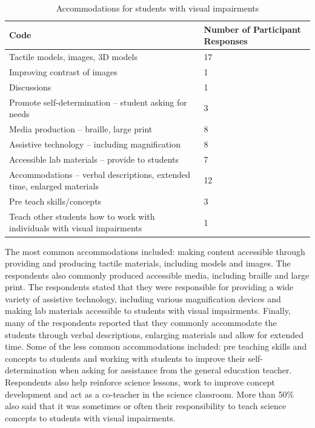 \documentclass[11.5pt]{sig-alternate} %
\begin{document}
\begin{large}
\begin{table}[h]
\caption{Accommodations for students with visual impairments}
\begin{tabular}{ll}
\hline
\textbf{Code} & \textbf{Number of Participant Responses} \\ \hline
Tactile models, images, 3D models & 17 \\
Improving contrast of images & 1 \\
Discussions	& 1 \\
Promote self-determination – student asking for needs & 3 \\
Media production – braille, large print	& 8 \\
Assistive technology – including magnification & 8 \\
Accessible lab materials – provide to students & 7 \\
Accommodations – verbal descriptions, extended time, enlarged materials & 12 \\
Pre teach skills/concepts & 3 \\
Teach other students how to work with individuals with visual impairments & 1 \\ \hline
\end{tabular}
\end{table}

The most common accommodations included: making content accessible through providing and producing tactile materials, including models and images.  The respondents also commonly produced accessible media, including braille and large print.  The respondents stated that they were responsible for providing a wide variety of assistive technology, including various magnification devices and making lab materials accessible to students with visual impairments.  Finally, many of the respondents reported that they commonly accommodate the students through verbal descriptions, enlarging materials and allow for extended time.   Some of the less common accommodations included: pre teaching skills and concepts to students and working with students to improve their self-determination when asking for assistance from the general education teacher.  Respondents also help reinforce science lessons, work to improve concept development and act as a co-teacher in the science classroom.  More than 50\% also said that it was sometimes or often their responsibility to teach science concepts to students with visual impairments.  


\end{large}
\end{document}
